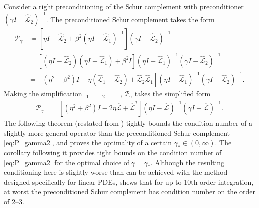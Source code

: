 \documentclass[review]{siamart}
\DeclareMathOperator{\cL}{\widehat{\mathcal{L}}}
\begin{document}
Consider a right preconditioning of the Schur complement with preconditioner
$(\gamma I- \widehat{\mathcal{L}}_2)^{-1}$. The preconditioned Schur complement
takes the form
%
\begin{align}\label{eq:P_gamma}
\mathcal{P}_\gamma &\coloneqq
	\left[\eta I - \widehat{\mathcal{L}}_2 + \beta^2 (\eta I - \widehat{\mathcal{L}}_1)^{-1}\right]
	(\gamma I- \widehat{\mathcal{L}}_2)^{-1} \\
& = \left[(\eta I - \widehat{\mathcal{L}}_2)(\eta I - \widehat{\mathcal{L}}_1) + \beta^2 I\right]
	(\eta I- \widehat{\mathcal{L}}_1)^{-1}(\gamma I- \widehat{\mathcal{L}}_2)^{-1} \nonumber\\
& = \left[ (\eta^2+\beta^2) I - \eta (\widehat{\mathcal{L}}_1 + \widehat{\mathcal{L}}_2) +
		\widehat{\mathcal{L}}_2\widehat{\mathcal{L}}_1 \right]
		(\eta I- \widehat{\mathcal{L}}_1)^{-1}(\gamma I- \widehat{\mathcal{L}}_2)^{-1}.
		\nonumber
\end{align}
%
Making the simplification $\cL_1 = \cL_2 = \cL$, $\mathcal{P}_\gamma$ takes the
simplified form
%
\begin{align}\label{eq:P_gamma2}
\mathcal{P}_\gamma & = \left[ (\eta^2+\beta^2) I - 2\eta \widehat{\mathcal{L}} +
	\widehat{\mathcal{L}}^2 \right](\eta I- \widehat{\mathcal{L}})^{-1}
	(\gamma I- \widehat{\mathcal{L}})^{-1}.
\end{align}
%
The following theorem (restated from \cite[Th. 5]{irk1}) tightly bounds
the condition number of a slightly more general operator than the preconditioned
Schur complement \eqref{eq:P_gamma2}, and proves the optimality of a certain
$\gamma_* \in (0,
\infty)$. The corollary following it provides tight bounds on the condition
number of \eqref{eq:P_gamma2} for the optimal choice of $\gamma = \gamma_*$.
%
Although the resulting conditioning here is slightly worse than can be achieved with the
method designed specifically for linear PDEs,  shows that
for up to 10th-order integration, at worst the preconditioned Schur complement
has condition number on the order of 2--3.
\end{document}
